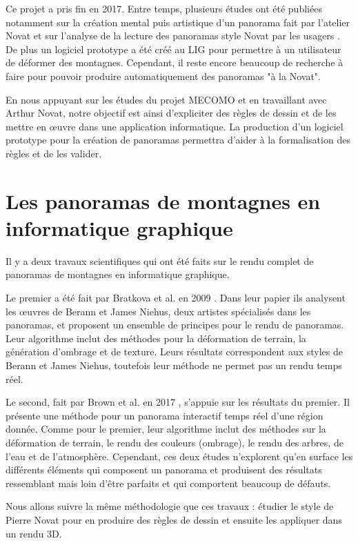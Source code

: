 Ce projet a pris fin en 2017. Entre temps, plusieurs études ont été publiées notamment sur la création mental puis artistique d'un panorama fait par l'atelier Novat \cite{balzarini2015study} et sur l'analyse de la lecture des panoramas style Novat par les usagers \cite{balzarini2016effectiveness}. De plus un logiciel prototype a été créé au LIG pour permettre à un utilisateur de déformer des montagnes.  
Cependant, il reste encore beaucoup de recherche à faire pour pouvoir produire automatiquement des panoramas "à la Novat". 

En nous appuyant sur les études du projet MECOMO et en travaillant avec Arthur Novat, notre objectif est ainsi d'expliciter des règles de dessin et de les mettre en œuvre dans une application informatique. 
La production d'un logiciel prototype pour la création de panoramas permettra d'aider à la formalisation des règles et de les valider.

\section{Les panoramas de montagnes en informatique graphique}

Il y a deux travaux scientifiques qui ont été faits sur le rendu complet de panoramas de montagnes en informatique graphique. 

Le premier a été fait par Bratkova et al. en 2009 \cite{bratkova2009artistic}. Dans leur papier ils analysent les œuvres de Berann et James Niehus, deux artistes spécialisés dans les panoramas, et proposent un ensemble de principes pour le rendu de panoramas. Leur algorithme inclut des méthodes pour la déformation de terrain, la génération d'ombrage et de texture. Leurs résultats correspondent aux styles de Berann et James Niehus, toutefois leur méthode ne permet pas un rendu temps réel. 

Le second, fait par Brown et al. en 2017 \cite{brown2017real}, s'appuie sur les résultats du premier. Il présente une méthode pour un panorama interactif temps réel d'une région donnée. Comme pour le premier, leur algorithme inclut des méthodes sur la déformation de terrain, le rendu des couleurs (ombrage), le rendu des arbres, de l'eau et de l'atmosphère. Cependant, ces deux études n'explorent qu'en surface les différents éléments qui composent un panorama et produisent des résultats ressemblant mais loin d'être parfaits et qui comportent beaucoup de défauts. 

Nous allons suivre la même méthodologie que ces travaux : étudier le style de Pierre Novat pour en produire des règles de dessin et ensuite les appliquer dans un rendu 3D.



